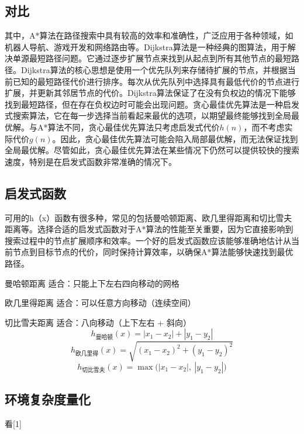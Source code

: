 \documentclass{article}
\begin{document}
\subsection{对比}
其中，A*算法在路径搜索中具有较高的效率和准确性，广泛应用于各种领域，如机器人导航、游戏开发和网络路由等。Dijkstra算法是一种经典的图算法，用于解决单源最短路径问题。它通过逐步扩展节点来找到从起点到所有其他节点的最短路径。Dijkstra算法的核心思想是使用一个优先队列来存储待扩展的节点，并根据当前已知的最短路径代价进行排序。每次从优先队列中选择具有最低代价的节点进行扩展，并更新其邻居节点的代价。Dijkstra算法保证了在没有负权边的情况下能够找到最短路径，但在存在负权边时可能会出现问题。贪心最佳优先算法是一种启发式搜索算法，它在每一步选择当前看起来最优的选项，以期望最终能够找到全局最优解。与A*算法不同，贪心最佳优先算法只考虑启发式代价$h(n)$，而不考虑实际代价$g(n)$。因此，贪心最佳优先算法可能会陷入局部最优解，而无法保证找到全局最优解。尽管如此，贪心最佳优先算法在某些情况下仍然可以提供较快的搜索速度，特别是在启发式函数非常准确的情况下。
\subsection{启发式函数}
可用的h（x）函数有很多种，常见的包括曼哈顿距离、欧几里得距离和切比雪夫距离等。选择合适的启发式函数对于A*算法的性能至关重要，因为它直接影响到搜索过程中的节点扩展顺序和效率。一个好的启发式函数应该能够准确地估计从当前节点到目标节点的代价，同时保持计算效率，以确保A*算法能够快速找到最优路径。

曼哈顿距离
适合：只能上下左右四向移动的网格

欧几里得距离
适合：可以任意方向移动（连续空间）

切比雪夫距离
适合：八向移动（上下左右 + 斜向）
\[
h_{\text{曼哈顿}}(x) = |x_1 - x_2| + |y_1 - y_2|
\]
\[
h_{\text{欧几里得}}(x) = \sqrt{(x_1 - x_2)^2 + (y_1 - y_2)^2}
\]
\[
h_{\text{切比雪夫}}(x) = \max\bigl(|x_1 - x_2|,\ |y_1 - y_2|\bigr)
\]
\subsection{环境复杂度量化}
看[1]
\end{document}
